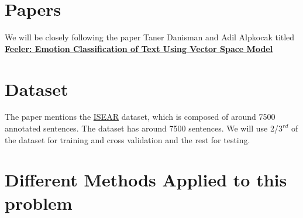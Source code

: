
\newpage
\section{Papers}
\label{paper-details}
 We will be closely following the paper Taner Danisman and Adil Alpkocak titled \href{http://people.cs.deu.edu.tr/alpkocak/Papers/AISB08.pdf}{\textbf{Feeler: Emotion Classification of Text Using Vector Space Model}}

\section{Dataset}
\label{dataset-details}
The paper mentions the \href{https://github.com/bogdanneacsa/tts-master/blob/master/ISEAR/DATA.csv}{ISEAR} dataset, which is composed of around 7500 annotated sentences. The dataset has around 7500 sentences. We will use 2/$3^{rd}$ of the dataset for training and cross validation and the rest for testing.

\section{Different Methods Applied to this problem}
